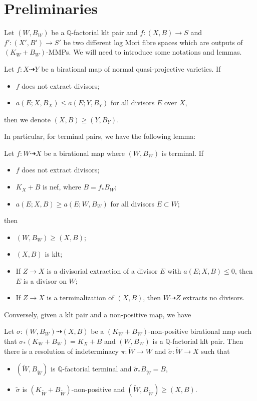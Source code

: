 \section{Preliminaries}
Let $(W, B_W)$ be a $\mathbb{Q}$-factorial klt pair and $f:(X, B)\to S$ and $f':(X', B')\to S'$ be two different log Mori fibre spaces which are outputs of $(K_{W}+B_{W})$-MMPs.  We will need to introduce some notations and lemmas.
\begin{definition}
  Let $f: X\dashrightarrow Y$ be a birational map of normal quasi-projective varieties. If
  \begin{itemize}
    \item $f$ does not extract divisors;
    \item $a(E;X,B_{X})\leqslant a(E;Y,B_{Y})$ for all divisors  $E$  over $X$,
  \end{itemize}
  then we denote $(X,B)\geqslant (Y,B_{Y})$.
\end{definition}
In particular, for terminal pairs, we have the following lemma:
\begin{lemma}\label{terminalorder}
  \cite[Lemma 13.8]{haconMinimalModelProgram2012} Let $f:W\dashrightarrow X$ be a birational map where $(W,B_W)$ is terminal. If
  \begin{itemize}
    \item $f$ does not extract divisors;
    \item $K_X+B$ is nef, where $B=f_*B_W$;
    \item $a(E;X,B)\geqslant a(E;W,B_W)$ for all divisors $E \subset W$;
  \end{itemize}
  then
  \begin{itemize}
    \item $(W,B_W)\geqslant (X,B)$;
    \item $(X,B)$ is klt;
    \item If $Z\to X$ is a divisorial extraction of a divisor $E$ with $a(E;X,B)\leqslant 0$, then $E$ is a divisor on $W$;
    \item If $Z\to X$ is a terminalization of $(X,B)$, then $W\dashrightarrow Z$ extracts no divisors.
  \end{itemize}
\end{lemma}
Conversely, given a klt pair and a non-positive map, we have
\begin{lemma}\label{terminalresolution}
  \cite[Lemma 3.5]{liuSarkisovProgramGeneralized2021} Let $\sigma:(W,B_W)\dashrightarrow (X,B)$ be a $(K_W+B_W)$-non-positive birational map such that $\sigma_*(K_W+B_W)=K_X+B$ and $(W,B_W)$ is a $\mathbb{Q}$-factorial klt pair. Then there is a resolution of indeterminacy $\pi:\tilde{W}\to W $ and $\tilde{\sigma}:\tilde{W}\to X$ such that
  \begin{itemize}
    \item $(\tilde{W},B_{\tilde{W}})$ is $\mathbb{Q}$-factorial terminal and $\tilde{\sigma}_*B_{\tilde{W}}=B$,
    \item $\tilde{\sigma}$ is $(K_{\tilde{W}}+B_{\tilde{W}})$-non-positive and $(\tilde{W},B_{\tilde{W}})\geqslant (X,B)$.
  \end{itemize}
\end{lemma}

